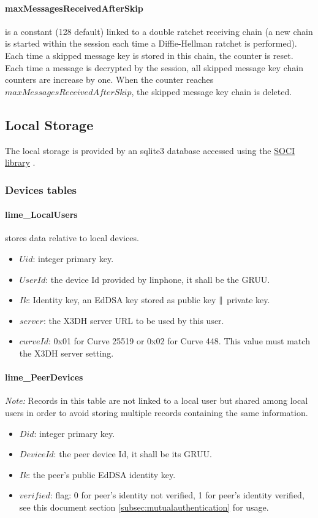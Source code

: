 \documentclass[a4paper,11pt]{article}
\begin{document}
      \paragraph{maxMessagesReceivedAfterSkip} is a constant (128 default) linked to a double ratchet receiving chain (a new chain is started within the session each time a Diffie-Hellman ratchet is performed). Each time a skipped message key is stored in this chain, the counter is reset. Each time a message is decrypted by the session, all skipped message key chain counters are increase by one. When the counter reaches $maxMessagesReceivedAfterSkip$, the skipped message key chain is deleted.
    

  \subsection{Local Storage}
    The local storage is provided by an sqlite3 database accessed using the \href{https://github.com/SOCI/soci}{SOCI library} \cite{libsoci}.
    \subsubsection{Devices tables}
    \paragraph*{lime\_LocalUsers} stores data relative to local devices.
    \begin{itemize}
      \item $Uid$: integer primary key.
      \item $UserId$: the device Id provided by linphone, it shall be the GRUU.
      \item $Ik$: Identity key, an EdDSA key stored as public key $\Arrowvert $ private key.
      \item $server$: the X3DH server URL to be used by this user.
      \item $curveId$: 0x01 for Curve 25519 or 0x02 for Curve 448. This value must match the X3DH server setting.
    \end{itemize}
    
    \paragraph*{lime\_PeerDevices}
    \textit{Note:} Records in this table are not linked to a local user but shared among local users in order to avoid storing multiple records containing the same information.
    \begin{itemize}
      \item $Did$: integer primary key.
      \item $DeviceId$: the peer device Id, it shall be its GRUU.
      \item $Ik$: the peer's public EdDSA identity key.
      \item $verified$: flag: 0 for peer's identity not verified, 1 for peer's identity verified, see this document section \ref{subsec:mutualauthentication} for usage.
    \end{itemize}
    
\end{document}
